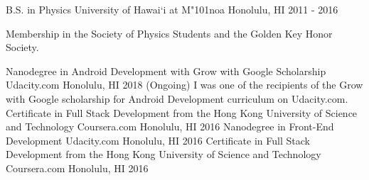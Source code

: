 \begin{cventries}
	\cventry
	{B.S. in Physics}
	{University of Hawai`i at M{\char"101}noa}
	{Honolulu, HI}
	{2011 - 2016}
	{
	  \begin{cvitems}
	    \item {Membership in the Society of Physics Students and the Golden Key Honor Society.}
	  \end{cvitems}
	}
	\cventry
	{Nanodegree in Android Development with Grow with Google Scholarship}
	{Udacity.com}
	{Honolulu, HI}
	{2018 (Ongoing)}
	{I was one of the recipients of the Grow with Google scholarship for Android Development curriculum on Udacity.com.}  
	\cventry
	{Certificate in Full Stack Development from the Hong Kong University of Science and Technology}
	{Coursera.com}
	{Honolulu, HI}
	{2016}
	{}  
	\cventry
	{Nanodegree in Front-End Development}
	{Udacity.com}
	{Honolulu, HI}
	{2016}
	{}  
	\cventry
	{Certificate in Full Stack Development from the Hong Kong University of Science and Technology}
	{Coursera.com}
	{Honolulu, HI}
	{2016}
	{}  
\end{cventries}
